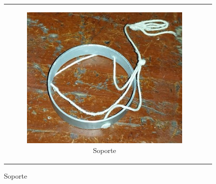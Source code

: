 \documentclass[../main.tex]{subfiles}
\begin{document}
\begin{figure}[H]
\begin{tabular}{c c}
\begin{subfigure}{0.5\textwidth}
            \includegraphics[width=0.8\linewidth,height=0.6\linewidth]{resources/mat6.jpg}
            \caption{Soporte}
            \label{fig:mat6}
        \end{subfigure}
        \\
    \end{tabular}
\end{figure}
\end{document}
